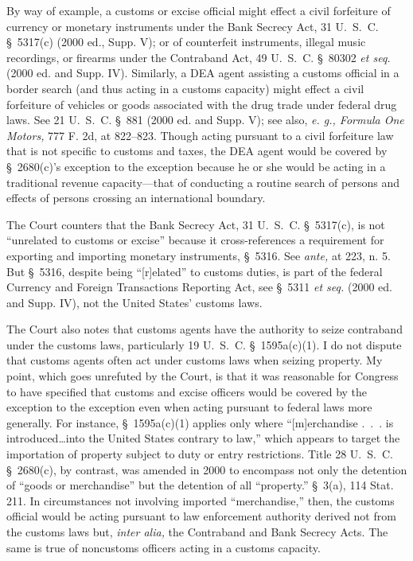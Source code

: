   By way of example, a customs or excise official might effect a civil forfeiture of currency or monetary instruments under the Bank Secrecy Act, 31 U.~S.~C. \S~5317(c) (2000 ed., Supp. V); or of counterfeit instruments, illegal music recordings, or firearms under the Contraband Act, 49 U.~S.~C. \S~80302 \emph{et seq.} (2000 ed. and Supp. IV). Similarly, a DEA agent assisting a customs official in a border search (and thus acting in a customs capacity) might effect a civil forfeiture of vehicles or goods associated with the drug trade under federal drug laws. See 21 U.~S.~C. \S~881 (2000 ed. and Supp. V); see also, \emph{e. g., Formula One Motors,} 777 F. 2d, at 822--823. Though acting pursuant to a civil forfeiture law that is not specific to customs and taxes, the DEA agent would be covered by \S~2680(c)'s exception to the exception because he or she would be acting in a traditional revenue capacity---that of conducting a routine search of persons and effects of persons crossing an international boundary.

  The Court counters that the Bank Secrecy Act, 31 U.~S.~C. \S~5317(c), is not ``unrelated to customs or excise'' because it cross-references a requirement for exporting and importing monetary instruments, \S~5316. See \emph{ante,} at 223, n. 5. But \S~5316, despite being ``[r]elated'' to customs duties, is part of the federal Currency and Foreign Transactions Reporting Act, see \S~5311 \emph{et seq.} (2000 ed. and Supp. IV), not the United States' customs laws.

  The Court also notes that customs agents have the authority to seize contraband under the customs laws, particularly 19 U.~S.~C. \S~1595a(c)(1). I do not dispute that customs agents often act under customs laws when seizing property. My point, which goes unrefuted by the Court, is that it was reasonable for Congress to have specified that customs and excise officers would be covered by the exception to the exception even when acting pursuant to federal laws more generally. For instance, \S~1595a(c)(1) applies only where ``[m]er\newpage chandise .~.~. is introduced\dots into the United States contrary to law,'' which appears to target the importation of property subject to duty or entry restrictions. Title 28 U.~S.~C. \S~2680(c), by contrast, was amended in 2000 to encompass not only the detention of ``goods or merchandise'' but the detention of all ``property.'' \S~3(a), 114 Stat. 211. In circumstances not involving imported ``merchandise,'' then, the customs official would be acting pursuant to law enforcement authority derived not from the customs laws but, \emph{inter alia,} the Contraband and Bank Secrecy Acts. The same is true of noncustoms officers acting in a customs capacity.


